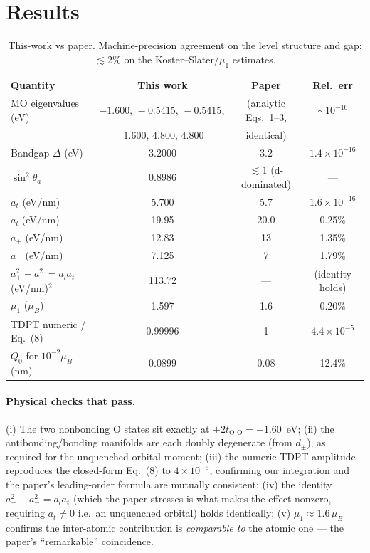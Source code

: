 \documentclass[11pt]{article}
\begin{document}
\section{Results}
\begin{table}[h]
\centering
\caption{This-work vs paper. Machine-precision agreement on the level structure and gap;
$\lesssim2\%$ on the Koster--Slater/$\mu_1$ estimates.}
\begin{tabular}{lccc}
\toprule
Quantity & This work & Paper & Rel.\ err \\
\midrule
MO eigenvalues (eV) & $-1.600,\,-0.5415,\,-0.5415,$ & (analytic Eqs.~1--3, & $\sim10^{-16}$ \\
                    & $\ 1.600,\,4.800,\,4.800$      & identical) & \\
Bandgap $\Delta$ (eV) & 3.2000 & 3.2 & $1.4\times10^{-16}$ \\
$\sin^2\theta_a$ & 0.8986 & $\lesssim1$ (d-dominated) & --- \\
$a_t$ (eV/nm) & 5.700 & 5.7 & $1.6\times10^{-16}$ \\
$a_l$ (eV/nm) & 19.95 & 20.0 & 0.25\% \\
$a_+$ (eV/nm) & 12.83 & 13 & 1.35\% \\
$a_-$ (eV/nm) & 7.125 & 7 & 1.79\% \\
$a_+^2-a_-^2=a_l a_t$ (eV/nm)$^2$ & 113.72 & --- & (identity holds) \\
$\mu_1$ ($\mu_B$) & 1.597 & 1.6 & 0.20\% \\
TDPT numeric / Eq.~(8) & 0.99996 & 1 & $4.4\times10^{-5}$ \\
$Q_0$ for $10^{-2}\mu_B$ (nm) & 0.0899 & 0.08 & 12.4\% \\
\bottomrule
\end{tabular}
\end{table}

\paragraph{Physical checks that pass.}
(i) The two nonbonding O states sit exactly at $\pm2t_{\mathrm{O\text{-}O}}=\pm1.60$~eV;
(ii) the antibonding/bonding manifolds are each doubly degenerate (from $d_\pm$), as required
for the unquenched orbital moment; (iii) the numeric TDPT amplitude reproduces the closed-form
Eq.~(8) to $4\times10^{-5}$, confirming our integration and the paper's leading-order formula
are mutually consistent; (iv) the identity $a_+^2-a_-^2=a_l a_t$ (which the paper stresses is
what makes the effect nonzero, requiring $a_t\neq0$ i.e.\ an unquenched orbital) holds
identically; (v) $\mu_1\approx1.6\,\mu_B$ confirms the inter-atomic contribution is
\emph{comparable to} the atomic one --- the paper's ``remarkable'' coincidence.
\end{document}
